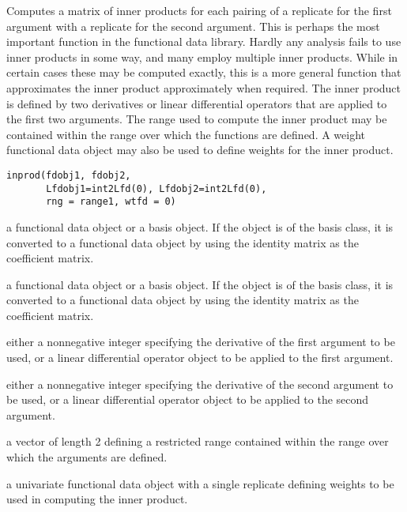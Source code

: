 \documentclass{article}
\begin{document}
\begin{Description}\relax
Computes a matrix of inner products for each pairing of a
replicate for the first argument with a replicate for the
second argument.  This is perhaps the most important function
in the functional data library.  Hardly any analysis fails
to use inner products in some way, and many employ multiple
inner products.  While in certain cases
these may be computed exactly, this is a more general function that
approximates the inner product approximately when required.
The inner product is defined by two derivatives or linear
differential operators that are applied to the
first two arguments.  The range used to compute the inner
product may be contained within the range over which the
functions are defined.  A weight functional data object may
also be used to define weights for the inner product.
\end{Description}
\begin{Usage}
\begin{verbatim}
inprod(fdobj1, fdobj2,
       Lfdobj1=int2Lfd(0), Lfdobj2=int2Lfd(0),
       rng = range1, wtfd = 0)
\end{verbatim}
\end{Usage}
\begin{Arguments}
\begin{ldescription}
\item[\code{fdobj1}] a functional data object or a basis object.  If the object is
of the basis class, it is converted to a functional data object
by using the identity matrix as the coefficient matrix.

\item[\code{fdobj2}] a functional data object or a basis object.  If the object is
of the basis class, it is converted to a functional data object
by using the identity matrix as the coefficient matrix.

\item[\code{Lfdobj1}] either a nonnegative integer specifying the derivative of
the first argument to be used, or a linear differential operator
object to be applied to the first argument.

\item[\code{Lfdobj2}] either a nonnegative integer specifying the derivative of
the second argument to be used, or a linear differential operator
object to be applied to the second argument.

\item[\code{rng}] a vector of length 2 defining a restricted range contained
within the range over which the arguments are defined.

\item[\code{wtfd}] a univariate functional data object with a single replicate
defining weights to be used in computing the inner product.

\end{ldescription}
\end{Arguments}
\end{document}
